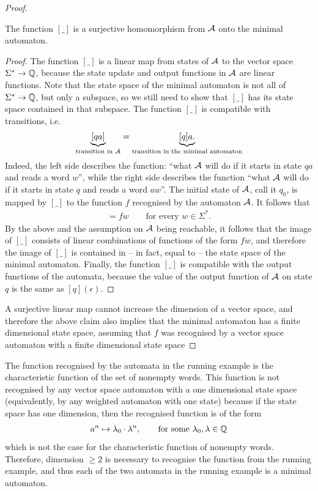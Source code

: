 \begin{proof}
\begin{claim}
	The function $[\_]$ is a surjective  homomorphism  from $\mathcal{A}$ onto  the minimal automaton. 
\end{claim}
\begin{proof}
The function $[\_]$ is a linear map from states of $\mathcal{A}$ to the vector space $\Sigma^* \to \mathbb Q$, because the state update and output functions in $\mathcal{A}$ are linear functions. Note that the state space of the minimal automaton is not all of $\Sigma^* \to \mathbb Q$, but only a subspace, so we still need to show that $[\_]$ has its state space contained in that subspace.  The function $[\_]$ is compatible with transitions, i.e.~
\begin{align*}
  \underbrace{[qa]}_{\text{transition in $\mathcal{A}$}} = \underbrace{[q]a.}_{\text{transition in the minimal automaton}}
\end{align*}
Indeed, the left side describes the function: ``what $\mathcal{A}$ will do if it starts in state $qa$ and reads a word $w$'', while the right side describes the function ``what $\mathcal{A}$ will do if it starts in state $q$ and reads a word $aw$''.
The initial state of $\mathcal{A}$, call it $q_0$,  is mapped by $[\_]$ to the function $f$ recognised by the automaton $\mathcal{A}$. It follows that 
\begin{align*}
[q_0	w] = fw \qquad \text{for every }w \in \Sigma^*.
\end{align*}
By the above and the  assumption on $\mathcal{A}$ being reachable,  it follows that the image of  $[\_]$ consists of  linear combinations of functions of the form $fw$, and therefore the image of $[\_]$ is contained in -- in fact, equal to -- the state space of the minimal automaton. Finally, the function $[\_]$ is compatible with the output functions of the automata, because the value of the output function of $\mathcal{A}$ on state $q$ is the same as $[q](\epsilon)$.  
\end{proof}

A surjective linear map cannot increase the dimension of a vector space, and therefore the above claim also implies that the minimal automaton has a finite dimensional state space, assuming that $f$ was recognised by a vector space automaton with a finite dimensional state space
\end{proof}

\begin{example} The function recognised by the automata in the running example is the characteristic function of the set of nonempty words. This function is not recognised by any vector space automaton with a one dimensional state space (equivalently, by any weighted automaton with one state) because if the state space has one dimension, then the recognised function is of the form
\begin{align*}
  a^n \mapsto   \lambda_0 \cdot \lambda^n, \qquad \text{for some $\lambda_0,\lambda \in \mathbb Q$}
\end{align*}
which is not the case for the characteristic function of nonempty words. Therefore, dimension $\ge 2$ is  necessary to recognise the function from the running example, and thus each of the two automata in the running example is a minimal automaton.
\end{example}

